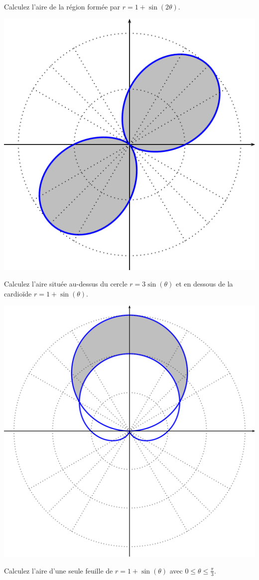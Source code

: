 \documentclass[]{book}
\theoremstyle{definition}
\theoremstyle{definition}
\theoremstyle{definition}
\theoremstyle{remark}
\let\BeginKnitrBlock\begin \let\EndKnitrBlock\end
\begin{document}
\BeginKnitrBlock{example}
\protect\hypertarget{exm:unnamed-chunk-109}{}{\label{exm:unnamed-chunk-109}
}Calculez l'aire de la région formée par \(r=1+\sin(2\theta)\).
\EndKnitrBlock{example}

\begin{center}\includegraphics[width=0.5\linewidth]{resources/images/latex/ex1airepolaire} \end{center}
\vspace*{10cm}

\BeginKnitrBlock{example}
\protect\hypertarget{exm:unnamed-chunk-110}{}{\label{exm:unnamed-chunk-110}
}Calculez l'aire située au-dessus du cercle \(r=3\sin(\theta)\) et en
dessous de la cardioïde \(r=1+\sin(\theta)\).
\EndKnitrBlock{example}

\begin{center}\includegraphics[width=0.5\linewidth]{resources/images/latex/ex2airepolaire} \end{center}
\vspace*{10cm}

\BeginKnitrBlock{example}
\protect\hypertarget{exm:unnamed-chunk-111}{}{\label{exm:unnamed-chunk-111}
}Calculez l'aire d'une seule feuille de \(r=1+\sin(\theta)\) avec
\(0\leq \theta \leq \frac{\pi}{3}\).
\EndKnitrBlock{example}
\vspace*{10cm}
\end{document}
